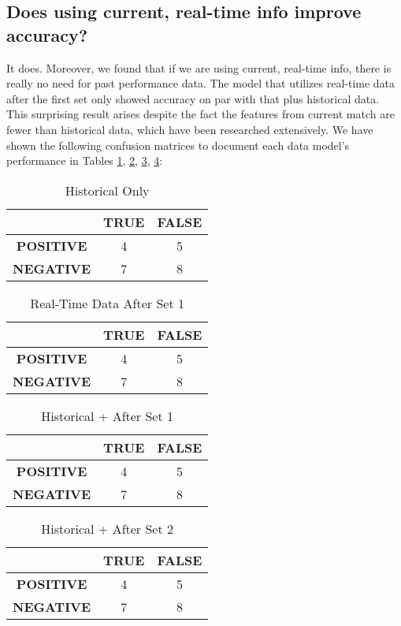 \documentclass[paper=a4, fontsize=10pt]{scrartcl} %
\numberwithin{equation}{section} %
\numberwithin{figure}{section} %
\numberwithin{table}{section} %
\begin{document}
\subsection{Does using current, real-time info improve accuracy?}
It does. Moreover, we found that if we are using current, real-time info, there is really no need for past performance data. The model that utilizes real-time data after the first
set only showed accuracy on par with that plus historical data. This surprising result arises despite the fact the features from current match are fewer than historical data, which have been researched extensively. We have shown the following confusion matrices to document each data model's performance in Tables \ref{tab:h1}, \ref{tab:h2}, \ref{tab:h3}, \ref{tab:h4}: 
\begin{table}[h]
\caption{Historical Only}
\label{tab:h1}
\begin{tabular}{ c | c | c}
    \hline
    & \textbf{TRUE} & \textbf{FALSE}  \\ \hline
   \textbf{POSITIVE} &  4 & 5  \\ \hline
   \textbf{NEGATIVE} & 7 & 8  \\ \hline
\end{tabular}
\end{table}
\begin{table}[h]
\caption{Real-Time Data After Set 1}
\label{tab:h2}
\begin{tabular}{ c | c | c}
    \hline
    & \textbf{TRUE} & \textbf{FALSE}  \\ \hline
   \textbf{POSITIVE} &  4 & 5  \\ \hline
   \textbf{NEGATIVE} & 7 & 8  \\ \hline
\end{tabular}
\end{table}
\begin{table}[h]
\caption{Historical + After Set 1}
\label{tab:h3}
\begin{tabular}{ c | c | c}
    \hline
    & \textbf{TRUE} & \textbf{FALSE}  \\ \hline
   \textbf{POSITIVE} &  4 & 5  \\ \hline
   \textbf{NEGATIVE} & 7 & 8  \\ \hline
\end{tabular}
\end{table}
\begin{table}[h]
\caption{Historical + After Set 2}
\label{tab:h4}
\begin{tabular}{ c | c | c}
    \hline
    & \textbf{TRUE} & \textbf{FALSE}  \\ \hline
   \textbf{POSITIVE} &  4 & 5  \\ \hline
   \textbf{NEGATIVE} & 7 & 8  \\ \hline
\end{tabular}
\end{table}
\end{document}
